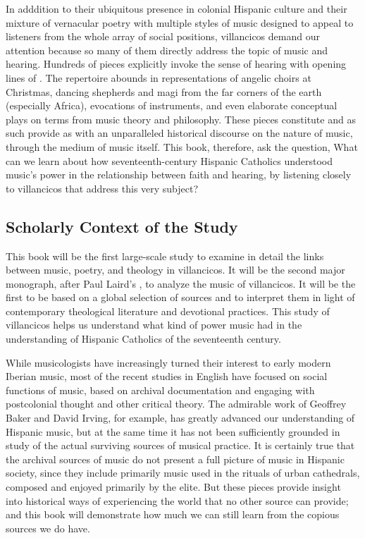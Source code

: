 \documentclass{vcbook-proposal}
\begin{document}
In adddition to their ubiquitous presence in colonial Hispanic culture and their mixture of vernacular poetry with multiple styles of music designed to appeal to listeners from the whole array of social positions, villancicos demand our attention because so many of them directly address the topic of music and hearing.
Hundreds of pieces explicitly invoke the sense of hearing with opening lines of   .
The repertoire abounds in representations of angelic choirs at Christmas, dancing shepherds and magi from the far corners of the earth (especially Africa), evocations of instruments, and even elaborate conceptual plays on terms from music theory and philosophy.
These pieces constitute  and as such provide as with an unparalleled historical discourse on the nature of music, through the medium of music itself.
This book, therefore, ask the question,
What can we learn about how seventeenth-century Hispanic Catholics understood music's power in the relationship between faith and hearing, by listening closely to villancicos that address this very subject?

\subsection{Scholarly Context of the Study} %

This book will be the first large-scale study to examine in detail the links between music, poetry, and theology in villancicos.
It will be the second major monograph, after Paul Laird's , to analyze the music of villancicos.
It will be the first to be based on a global selection of sources and to interpret them in light of contemporary theological literature and devotional practices.
This study of villancicos helps us understand what kind of power music had in the understanding of Hispanic Catholics of the seventeenth century.

While musicologists have increasingly turned their interest to early modern Iberian music, most of the recent studies in English have focused on social functions of music, based on archival documentation and engaging with postcolonial thought and other critical theory.
The admirable work of Geoffrey Baker and David Irving, for example, has greatly advanced our understanding of Hispanic music, but at the same time it has not been sufficiently grounded in study of the actual surviving sources of musical practice.
It is certainly true that the archival sources of music do not present a full picture of music in Hispanic society, since they include primarily music used in the rituals of urban cathedrals, composed and enjoyed primarily by the elite.
But these pieces provide insight into historical ways of experiencing the world that no other source can provide; and this book will demonstrate how much we can still learn from the copious sources we do have.
\end{document}
